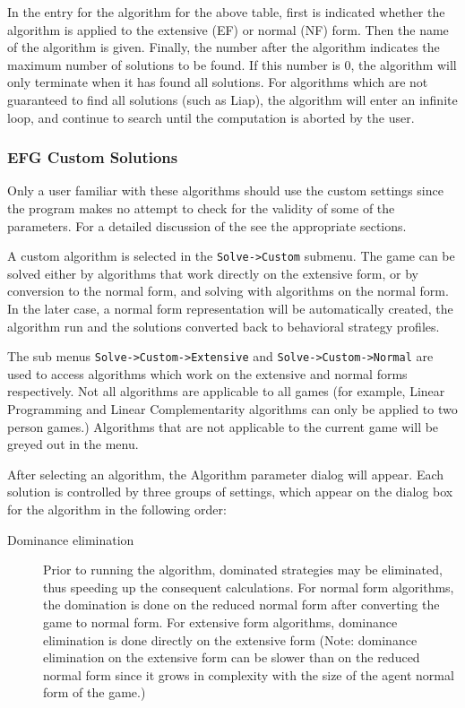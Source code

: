 {In the entry for the algorithm for the above table, first is indicated whether the algorithm 
is applied to the extensive (EF) or normal (NF) form. Then the name of the algorithm is 
given.  Finally, the number after the algorithm indicates the maximum number of solutions 
to be found.  If this number is 0, the algorithm will only terminate when it has found 
all solutions.  For algorithms which are not guaranteed to find all solutions (such 
as Liap), the 
algorithm will enter an infinite loop, and continue to search until the computation is 
aborted by the user.  

\subsubsection{EFG Custom Solutions}\label{EFGCustomSolutions}
Only a user familiar with these algorithms should use the custom settings
since the program makes no attempt to check for the validity of some of
the parameters.  For a detailed discussion of the 
 see the appropriate sections.

A custom algorithm is selected in the {\tt Solve->Custom} submenu.  The game 
can be solved either by algorithms that work directly on the extensive form, 
or by conversion to the normal form, and solving with algorithms on the 
normal form.  In the later case, a normal form representation
will be automatically created, the algorithm run and the solutions 
converted back to behavioral strategy profiles. 

The sub menus {\tt Solve->Custom->Extensive} and 
{\tt Solve->Custom->Normal} are 
used to access algorithms which work on the extensive and normal forms 
respectively.  Not all algorithms are applicable to 
all games (for example, Linear Programming and Linear Complementarity 
algorithms can only be applied to two person 
games.)  Algorithms that are not applicable to the current game will be greyed 
out in the menu.  

After selecting an algorithm, the Algorithm parameter dialog 
will appear. Each solution is controlled by three groups of 
settings, which appear on the dialog box for the algorithm in the 
following order:

\begin{description}
\item[Dominance elimination] Prior to running the algorithm, 
dominated strategies may be eliminated, thus speeding up the consequent 
calculations.  For normal form algorithms, the domination is done on the 
reduced normal form after converting the game to normal form.  For extensive form 
algorithms, dominance elimination is done directly on the extensive form (Note: 
dominance elimination on the extensive form can be slower than on the reduced 
normal form since it grows in complexity with the size of the agent 
normal form of the game.)  


\end{description}}
